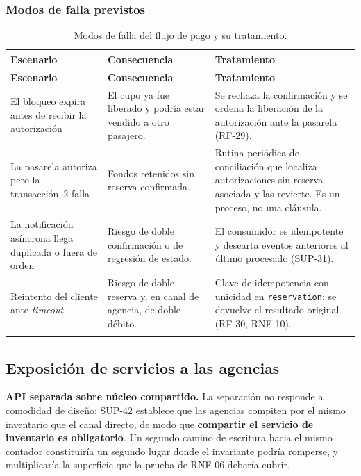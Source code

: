 \documentclass[10pt,letterpaper]{article}
\begin{document}
\subsubsection{Modos de falla previstos}
\begin{longtable}{@{}L{4.6cm} L{4.6cm} L{6.0cm}@{}}
\toprule \textbf{Escenario} & \textbf{Consecuencia} & \textbf{Tratamiento} \\ \midrule \endfirsthead
\toprule \textbf{Escenario} & \textbf{Consecuencia} & \textbf{Tratamiento} \\ \midrule \endhead
El bloqueo expira antes de recibir la autorización & El cupo ya fue liberado y podría estar vendido a otro pasajero. & Se rechaza la confirmación y se ordena la liberación de la autorización ante la pasarela (RF-29). \\
La pasarela autoriza pero la transacción~2 falla & Fondos retenidos sin reserva confirmada. & Rutina periódica de conciliación que localiza autorizaciones sin reserva asociada y las revierte. Es un proceso, no una cláusula. \\
La notificación asíncrona llega duplicada o fuera de orden & Riesgo de doble confirmación o de regresión de estado. & El consumidor es idempotente y descarta eventos anteriores al último procesado (SUP-31). \\
Reintento del cliente ante \emph{timeout} & Riesgo de doble reserva y, en canal de agencia, de doble débito. & Clave de idempotencia con unicidad en \texttt{reservation}; se devuelve el resultado original (RF-30, RNF-10). \\
\bottomrule
\caption{Modos de falla del flujo de pago y su tratamiento.}
\end{longtable}

\subsection{Exposición de servicios a las agencias}
\textbf{API separada sobre núcleo compartido.} La separación no responde a comodidad de diseño: SUP-42 establece que las agencias compiten por el mismo inventario que el canal directo, de modo que \textbf{compartir el servicio de inventario es obligatorio}. Un segundo camino de escritura hacia el mismo contador constituiría un segundo lugar donde el invariante podría romperse, y multiplicaría la superficie que la prueba de RNF-06 debería cubrir.
\end{document}
